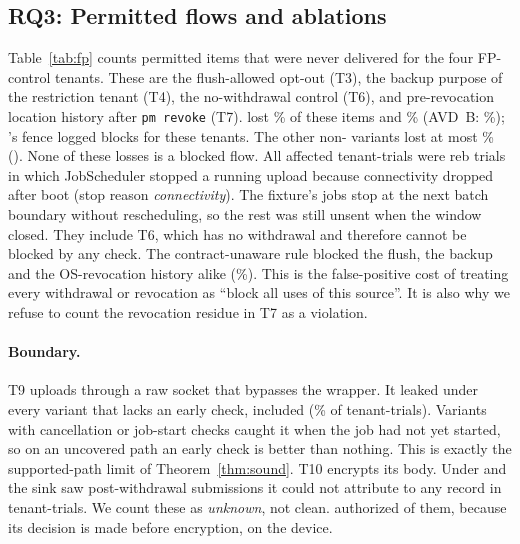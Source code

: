 \subsection{RQ3: Permitted flows and ablations}
\label{sec:eval-fp}
\label{sec:eval-boundary}



Table~\ref{tab:fp} counts permitted items that were never delivered for the four FP-control tenants. These are the
flush-allowed opt-out (T3), the backup purpose of the restriction tenant (T4), the no-withdrawal control (T6), and
pre-revocation location history after \texttt{pm revoke} (T7).  lost \% of these items and \sys
{}\% (AVD~B: \%); \sys's fence logged \rdFpBlocks{} blocks for these tenants. The other non- variants lost at most \%
(). None of these losses is a blocked flow. All  affected tenant-trials were \textsf{reb} trials in
which JobScheduler stopped a running upload because connectivity dropped after boot (stop reason \emph{connectivity}). The fixture's jobs stop at
the next batch boundary without rescheduling, so the rest was still unsent when the window closed. They include T6, which has no
withdrawal and therefore cannot be blocked by any check. The contract-unaware  rule
blocked the flush, the backup and the OS-revocation history alike (\%). This is the false-positive cost of
treating every withdrawal or revocation as ``block all uses of this source''. It is also why we refuse to count the
revocation residue in T7 as a violation.

\paragraph{Boundary.} T9 uploads through a raw socket that bypasses the wrapper. It leaked under every variant that lacks an
early check, \sys included (\rdUnmedPct{}\% of \sys tenant-trials). Variants with cancellation or job-start checks caught it
when the job had not yet started, so on an uncovered path an early check is better than nothing. This is exactly the
supported-path limit of Theorem~\ref{thm:sound}. T10 encrypts its body. Under  and  the sink saw
\opaqueUnknownSubs{} post-withdrawal submissions it could not attribute to any record in \opaqueTrials{} tenant-trials. We
count these as \emph{unknown}, not clean. \sys authorized \rdOpaqueUnknown{} of them, because its decision is made before
encryption, on the device.


